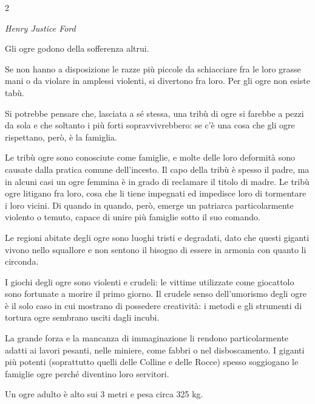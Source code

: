 \begin{multicols}{2}
{\begin{center}
\emph{Henry Justice Ford}
\end{center}

Gli ogre godono della sofferenza altrui.

Se non hanno a disposizione le razze più piccole da schiacciare fra le loro grasse mani o da violare in amplessi violenti, si divertono fra loro. Per gli ogre non esiste tabù.

Si potrebbe pensare che, lasciata a sé stessa, una tribù di ogre si farebbe a pezzi da sola e che soltanto i più forti sopravvivrebbero: se c'è una cosa che gli ogre rispettano, però, è la famiglia.

Le tribù ogre sono conosciute come famiglie, e molte delle loro deformità sono causate dalla pratica comune dell'incesto.
Il capo della tribù è spesso il padre, ma in alcuni casi un ogre femmina è in grado di reclamare il titolo di madre. Le tribù ogre litigano fra loro, cosa che li tiene impegnati ed impedisce loro di tormentare i loro vicini. Di quando in quando, però, emerge un patriarca particolarmente violento o temuto, capace di unire più famiglie sotto il suo comando.


Le regioni abitate degli ogre sono luoghi tristi e degradati, dato che questi giganti vivono nello squallore e non sentono il bisogno di essere in armonia con quanto li circonda.

I giochi degli ogre sono violenti e crudeli: le vittime utilizzate come giocattolo sono fortunate a morire il primo giorno. Il crudele senso dell'umorismo degli ogre è il solo caso in cui mostrano di possedere creatività: i metodi e gli strumenti di tortura ogre sembrano usciti dagli incubi.

La grande forza e la mancanza di immaginazione li rendono particolarmente adatti ai lavori pesanti, nelle miniere, come fabbri o nel disboscamento. I giganti più potenti (soprattutto quelli delle Colline e delle Rocce) spesso soggiogano le famiglie ogre perché diventino loro servitori.

Un ogre adulto è alto sui 3 metri e pesa circa 325 kg.



}
\end{multicols}
